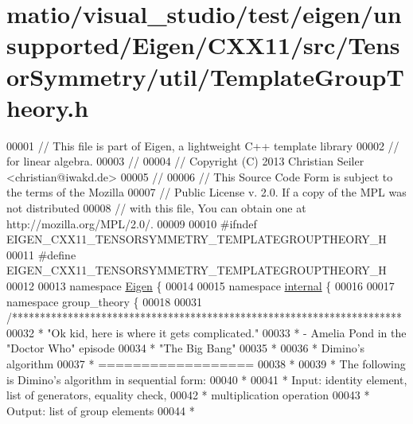 \hypertarget{matio_2visual__studio_2test_2eigen_2unsupported_2_eigen_2_c_x_x11_2src_2_tensor_symmetry_2util_2_template_group_theory_8h_source}{}\section{matio/visual\+\_\+studio/test/eigen/unsupported/\+Eigen/\+C\+X\+X11/src/\+Tensor\+Symmetry/util/\+Template\+Group\+Theory.h}
\label{matio_2visual__studio_2test_2eigen_2unsupported_2_eigen_2_c_x_x11_2src_2_tensor_symmetry_2util_2_template_group_theory_8h_source}

\begin{DoxyCode}
00001 \textcolor{comment}{// This file is part of Eigen, a lightweight C++ template library}
00002 \textcolor{comment}{// for linear algebra.}
00003 \textcolor{comment}{//}
00004 \textcolor{comment}{// Copyright (C) 2013 Christian Seiler <christian@iwakd.de>}
00005 \textcolor{comment}{//}
00006 \textcolor{comment}{// This Source Code Form is subject to the terms of the Mozilla}
00007 \textcolor{comment}{// Public License v. 2.0. If a copy of the MPL was not distributed}
00008 \textcolor{comment}{// with this file, You can obtain one at http://mozilla.org/MPL/2.0/.}
00009 
00010 \textcolor{preprocessor}{#ifndef EIGEN\_CXX11\_TENSORSYMMETRY\_TEMPLATEGROUPTHEORY\_H}
00011 \textcolor{preprocessor}{#define EIGEN\_CXX11\_TENSORSYMMETRY\_TEMPLATEGROUPTHEORY\_H}
00012 
00013 \textcolor{keyword}{namespace }\hyperlink{namespace_eigen}{Eigen} \{
00014 
00015 \textcolor{keyword}{namespace }\hyperlink{namespaceinternal}{internal} \{
00016 
00017 \textcolor{keyword}{namespace }group\_theory \{
00018 
00031 \textcolor{comment}{/**********************************************************************}
00032 \textcolor{comment}{ *                "Ok kid, here is where it gets complicated."}
00033 \textcolor{comment}{ *                         - Amelia Pond in the "Doctor Who" episode}
00034 \textcolor{comment}{ *                           "The Big Bang"}
00035 \textcolor{comment}{ *}
00036 \textcolor{comment}{ * Dimino's algorithm}
00037 \textcolor{comment}{ * ==================}
00038 \textcolor{comment}{ *}
00039 \textcolor{comment}{ * The following is Dimino's algorithm in sequential form:}
00040 \textcolor{comment}{ *}
00041 \textcolor{comment}{ * Input: identity element, list of generators, equality check,}
00042 \textcolor{comment}{ *        multiplication operation}
00043 \textcolor{comment}{ * Output: list of group elements}
00044 \textcolor{comment}{ *}

\end{DoxyCode}
